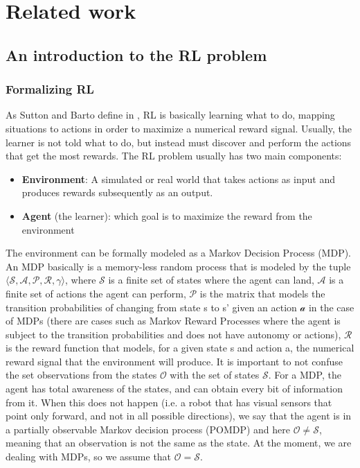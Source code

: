 
\chapter{Related work}
\label{cha:related-work}

\section{An introduction to the RL problem}
\label{sec:intro-rl}

\subsection{Formalizing RL}
\label{sec:form-intro-rl}
As Sutton and Barto define in \cite{intro_rl}, RL is basically learning what to do, mapping situations to actions in order to maximize a numerical reward signal. Usually, the learner is not told what to do, but instead must discover and perform the actions that get the most rewards. The RL problem usually has two main components:

\begin{itemize}
	\item \textbf{Environment}: A simulated or real world that takes actions as input and produces rewards subsequently as an output.
	\item \textbf{Agent} (the learner): which goal is to maximize the reward from the environment
\end{itemize}

The environment can be formally modeled as a Markov Decision Process (MDP). An MDP basically is a memory-less random process that is modeled by the tuple $\langle \mathcal{S,A,P,R},\gamma \rangle$, where $\mathcal{S}$ is a finite set of states where the agent can land, $\mathcal{A}$ is a finite set of actions the agent can perform, $\mathcal{P}$ is the matrix that models the transition probabilities of changing from state s to s' given an action $\mathcal{a}$ in the case of MDPs (there are cases such as Markov Reward Processes where the agent is subject to the transition probabilities and does not have autonomy or actions), $\mathcal{R}$ is the reward function that models, for a given state s and action a, the numerical reward signal that the environment will produce. It is important to not confuse the set observations from the states $\mathcal{O}$ with the set of states $\mathcal{S}$. For a MDP, the agent has total awareness of the states, and can obtain every bit of information from it. When this does not happen (i.e. a robot that has visual sensors that point only forward, and not in all possible directions), we say that the agent is in a partially observable Markov decision process (POMDP) and here $\mathcal{O} \neq \mathcal{S}$, meaning that an observation is not the same as the state. At the moment, we are dealing with MDPs, so we assume that $\mathcal{O} = \mathcal{S}$.

